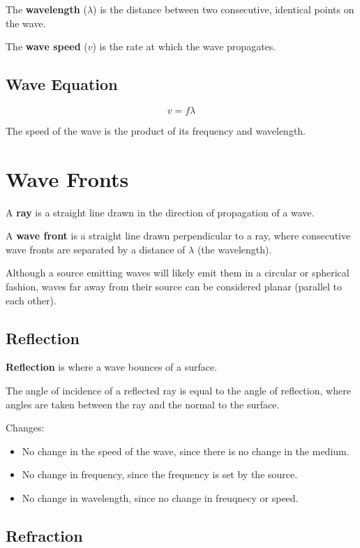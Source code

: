 \documentclass[a4paper,11pt]{report}
\begin{document}
The \textbf{wavelength} ($\lambda$) is the distance between two consecutive,
identical points on the wave.

The \textbf{wave speed} ($v$) is the rate at which the wave propagates.

\subsection{Wave Equation}

$$
v = f \lambda
$$

The speed of the wave is the product of its frequency and wavelength.


\section{Wave Fronts}

A \textbf{ray} is a straight line drawn in the direction of propagation of a
wave.

A \textbf{wave front} is a straight line drawn perpendicular to a ray, where
consecutive wave fronts are separated by a distance of $\lambda$ (the
wavelength).

Although a source emitting waves will likely emit them in a circular or
spherical fashion, waves far away from their source can be considered planar
(parallel to each other).

\subsection{Reflection}


\textbf{Reflection} is where a wave bounces of a surface.

The angle of incidence of a reflected ray is equal to the angle of reflection,
where angles are taken between the ray and the normal to the surface.

Changes:

\begin{itemize}
\item No change in the speed of the wave, since there is no change in the
	medium.
\item No change in frequency, since the frequency is set by the source.
\item No change in wavelength, since no change in freuqnecy or speed.
\end{itemize}

\subsection{Refraction}
\end{document}
